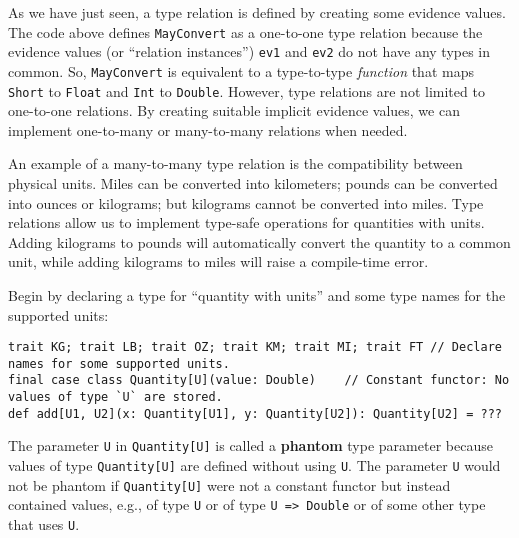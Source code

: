 As we have just seen, a type relation is defined by creating some
evidence values. The code above defines \lstinline!MayConvert! as
a one-to-one type relation because the evidence values (or \textsf{``}relation
instances\textsf{''}) \lstinline!ev1! and \lstinline!ev2! do not have any
types in common. So, \lstinline!MayConvert! is equivalent to a type-to-type
\emph{function} that maps \lstinline!Short! to \lstinline!Float!
and \lstinline!Int! to \lstinline!Double!. However, type relations
are not limited to one-to-one relations. By creating suitable implicit
evidence values, we can implement one-to-many or many-to-many relations
when needed. 

An example of a many-to-many type
relation is the compatibility between physical units. Miles can be
converted into kilometers; pounds can be converted into ounces or
kilograms; but kilograms cannot be converted into miles. Type relations
allow us to implement type-safe operations for quantities with units.
Adding kilograms to pounds will automatically convert the quantity
to a common unit, while adding kilograms to miles will raise a compile-time
error.

Begin by declaring a type for \textsf{``}quantity with units\textsf{''} and some type
names for the supported units:
\begin{lstlisting}
trait KG; trait LB; trait OZ; trait KM; trait MI; trait FT // Declare names for some supported units.
final case class Quantity[U](value: Double)    // Constant functor: No values of type `U` are stored.
def add[U1, U2](x: Quantity[U1], y: Quantity[U2]): Quantity[U2] = ???
\end{lstlisting}
The parameter \lstinline!U! in \lstinline!Quantity[U]! is called
a \textbf{phantom} type parameter because
values of type \lstinline!Quantity[U]! are defined without using
\lstinline!U!. The parameter \lstinline!U! would not be phantom
if \lstinline!Quantity[U]! were not a constant functor
but instead contained values, e.g., of type \lstinline!U! or of type
\lstinline!U => Double! or of some other type that uses \lstinline!U!. 


